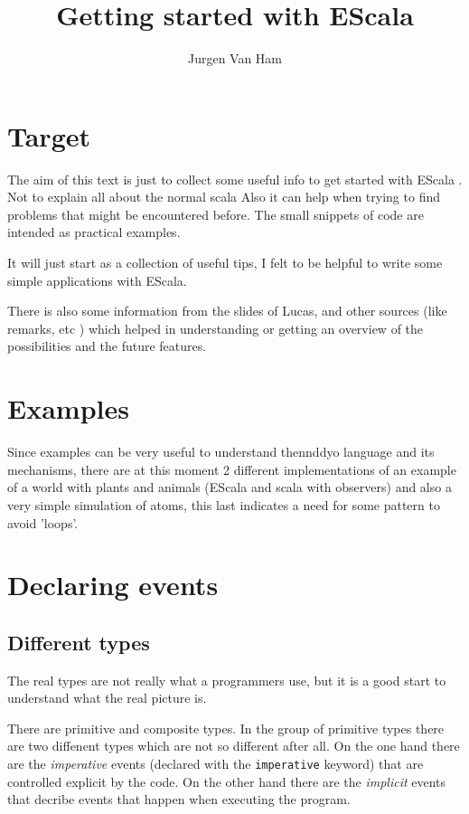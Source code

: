 \documentclass{article}
\title{Getting started with EScala}
\author{Jurgen Van Ham}
\newcommand{\escala}[0]{EScala }
\begin{document}
\maketitle
\tableofcontents

\section{Target}
The aim of this text is just to collect some useful info to get 
started with \escala. Not to explain all about the normal scala
Also it can help when trying to find problems that might be 
encountered before. The small snippets of code are intended as 
practical examples.

It will just start as a collection of useful tips, I felt to be 
helpful to write some simple applications with EScala. 

There is also some information from the slides of Lucas, and other 
sources (like remarks, etc ) which helped in understanding or getting 
an overview of the possibilities  and the future features.

\section{Examples}
Since examples can be very useful to understand thennddyo language and its
mechanisms, there are at this moment 2 different implementations of an
example of a world with plants and animals (\escala and scala with 
observers) and also a very simple simulation of atoms, this last 
indicates a need for some pattern to avoid 'loops'.

\section{Declaring events}

\subsection{Different types}
The real types are not really what a programmers use, but it is
a good start to understand what the real picture is.

There are primitive and composite types. In the group of primitive
types there are two diffenent types which are not so different after
all. On the one hand there are the \emph{imperative} events (declared
with the {\tt imperative} keyword) that are controlled explicit by 
the code. On the other hand there are the \emph{implicit}
events that decribe events that happen when executing the program.
\end{document}
